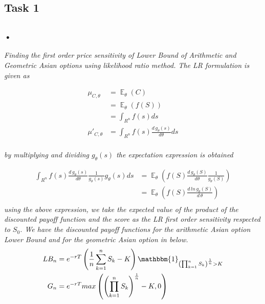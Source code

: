 \documentclass[10pt,oneside,a4paper]{article}
\DeclareMathOperator{\E}{\mathbb{E}}
\begin{document}
\begin{flushleft}


\section{Task 1}
\subsection{}
\subsubsection{•}
\textsl{Finding the first order price sensitivity of Lower Bound of Arithmetic and Geometric Asian options using likelihood ratio method. The LR formulation is given as}

\begin{align*}
\mu_{C, \theta} &= \E_\theta \left(C\right) \\
& = \E_\theta\left(f \left(S\right)\right) \\
& = \int_{R^n}^{} f \left(s\right) ds\\
\mu'_{C, \theta}&= \int_{R^n}^{} f \left(s\right)\frac{d \, g_\theta\left(s\right)}{d\theta}ds\\
\end{align*}

\textsl{by multiplying and dividing $g_\theta\left(s\right)$ the expectation expression is obtained}

\begin{align*}
\int_{R^n}^{} f \left(s\right)\frac{d \, g_\theta\left(s\right)}{d \theta} \frac{1}{g_\theta\left(s\right) }g_\theta\left(s\right) ds &= \E_\theta \left(f\left(S\right)\frac{d \, g_\theta\left(S\right)}{d \theta} \frac{1}{g_\theta\left(S\right) }\right)\\
&= \E_\theta \left(f\left(S\right)\frac{d \,ln \, g_\theta \left(S\right)}{d \, \theta}\right)\\
\end{align*}
\textsl{using the above expression, we take the expected value of the product of the discounted payoff function and the score as the LR first order sensitivity respected to $S_0$. We have the discounted payoff functions for the arithmetic Asian option Lower Bound  and for the geometric Asian option in below.}
\begin{align*}
LB_n &= e^{-rT}\left( \frac{1}{n}\sum_{k=1}^{n}S_k - K\right) \mathbbm{1}_{\left( \prod_{k=1}^{n}S_k\right) ^{\frac{1}{n}} >K}\\
G_n &= e^{-rT} max \left(\left(\prod_{k=1}^{n}S_k\right) ^{\frac{1}{n}} - K, 0 \right)\\
\end{align*}


\end{flushleft}
\end{document}
